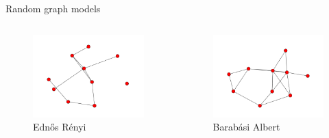\documentclass[11pt,xcolor={dvipsnames}]{beamer}
\begin{document}
\begin{frame}{Random graph models}
\begin{columns}
	\begin{column}{.5\textwidth}
		\begin{figure}[ht]
			\centering
			\includegraphics[width=\textwidth]{newER_graph_20.pdf}
			\caption{Edn\H{o}s R\'enyi}
		\end{figure}
	\end{column}
	\begin{column}{.5\textwidth}
		\begin{figure}[ht]
			\centering
			\includegraphics[width=\textwidth]{newBA_graph_2.pdf}
			\caption{Barab\'asi Albert}
		\end{figure}
	\end{column}
\end{columns}
\end{frame}
\end{document}
